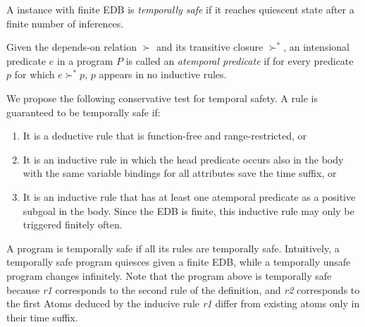\begin{definition}
%
A \slang instance with finite EDB is \emph{temporally safe} if it reaches
quiescent state after a finite number of inferences.
%
\end{definition}

\begin{definition}
%
Given the depends-on relation $\succ$ and its transitive closure $\succ^{*}$,
an intensional predicate $e$ in a program $P$ is called an \emph{atemporal
predicate} if for every predicate $p$ for which $e \succ^{*} p$, $p$ appears in
no inductive rules.
%
\end{definition}

We propose the following conservative test for temporal safety.  A rule is
guaranteed to be temporally safe if:

\begin{enumerate}
%
\item It is a deductive rule that is function-free and range-restricted, or
%
\item It is an inductive rule in which the head predicate occurs also in the
body with the same variable bindings for all attributes save the time suffix,
or
%
\item It is an inductive rule that has at least one atemporal predicate as a
positive subgoal in the body.  Since the EDB is finite, this inductive rule
may only be triggered finitely often.
%
\end{enumerate}


A \slang program is temporally safe if all its rules are temporally safe.
Intuitively, a temporally safe program quiesces given a finite EDB, while a
temporally unsafe program changes infinitely.  Note
that the \slang program above is temporally safe because \emph{r1} corresponds
to the second rule of the definition, and \emph{r2} corresponds to the first
Atoms deduced by the inducive rule \emph{r1} differ from existing atoms only in
their time suffix.

